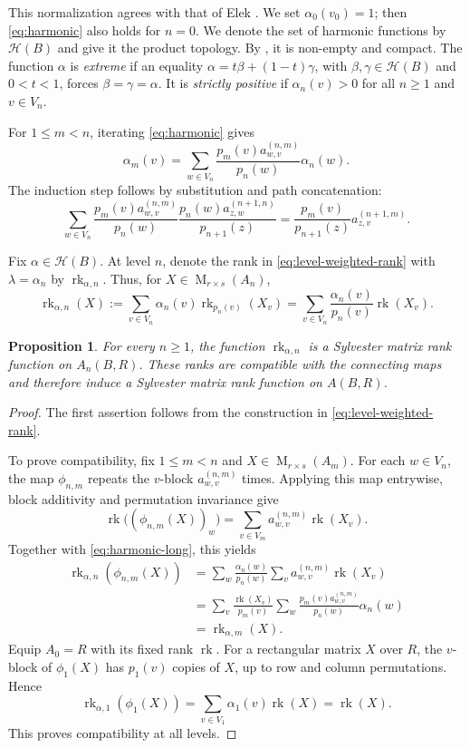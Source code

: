 \documentclass[11pt]{amsart}
\DeclareMathOperator{\rk}{rk}
\DeclareMathOperator{\Mat}{M}
\newtheorem{proposition}[theorem]{Proposition}
\theoremstyle{definition}
\theoremstyle{remark}
\begin{document}
This normalization agrees with that of Elek
\cite[Section~4]{Elek2013}.
We set $\alpha_0(v_0)=1$; then \eqref{eq:harmonic} also holds for $n=0$.
We denote the set of harmonic functions by $\mathcal H(B)$ and give it the
product topology.
By , it is non-empty and compact.
The function $\alpha$ is \emph{extreme} if an equality
$\alpha=t\beta+(1-t)\gamma$, with $\beta,\gamma\in\mathcal H(B)$ and $0<t<1$, forces
$\beta=\gamma=\alpha$.
It is \emph{strictly positive} if $\alpha_n(v)>0$ for all $n\geq1$ and
$v\in V_n$.

For \(1\leq m<n\), iterating \eqref{eq:harmonic} gives
\begin{equation}\label{eq:harmonic-long}
 \alpha_m(v)
 =\sum_{w\in V_n}
 \frac{p_m(v)a_{w,v}^{(n,m)}}{p_n(w)}\alpha_n(w).
\end{equation}
The induction step follows by substitution and path concatenation:
\[
 \sum_{w\in V_n}
 \frac{p_m(v)a_{w,v}^{(n,m)}}{p_n(w)}
 \frac{p_n(w)a_{z,w}^{(n+1,n)}}{p_{n+1}(z)}
 =\frac{p_m(v)}{p_{n+1}(z)}a_{z,v}^{(n+1,m)}.
\]

Fix $\alpha\in\mathcal H(B)$.  At level $n$, denote the rank in
\eqref{eq:level-weighted-rank} with $\lambda=\alpha_n$ by
$\rk_{\alpha,n}$.  Thus, for
$X\in\Mat_{r\times s}(A_n)$,
\begin{equation}\label{eq:weighted-matrix-rank}
 \rk_{\alpha,n}(X)
 :=\sum_{v\in V_n}\alpha_n(v)\rk_{p_n(v)}(X_v)
 =\sum_{v\in V_n}\frac{\alpha_n(v)}{p_n(v)}\rk(X_v).
\end{equation}
\begin{proposition}\label{prop:rank-compatible}
For every $n\geq1$, the function $\rk_{\alpha,n}$ is a Sylvester matrix rank
function on $A_n(B,R)$.  These ranks are compatible with the connecting maps
and therefore induce a Sylvester matrix rank function on $A(B,R)$.
\end{proposition}

\begin{proof}
The first assertion follows from the construction in
\eqref{eq:level-weighted-rank}.

To prove compatibility, fix $1\leq m<n$ and $X\in\Mat_{r\times s}(A_m)$.
For each $w\in V_n$, the map $\phi_{n,m}$ repeats the $v$-block
$a_{w,v}^{(n,m)}$ times.
Applying this map entrywise, block
additivity and permutation invariance give
\[
 \rk\bigl((\phi_{n,m}(X))_w\bigr)
 =\sum_{v\in V_m}a_{w,v}^{(n,m)}\rk(X_v).
\]
Together with \eqref{eq:harmonic-long}, this yields
\begin{align*}
 \rk_{\alpha,n}(\phi_{n,m}(X))
 &=\sum_w\frac{\alpha_n(w)}{p_n(w)}
   \sum_v a_{w,v}^{(n,m)}\rk(X_v)\\
 &=\sum_v\frac{\rk(X_v)}{p_m(v)}
   \sum_w\frac{p_m(v)a_{w,v}^{(n,m)}}{p_n(w)}\alpha_n(w)\\
 &=\rk_{\alpha,m}(X).
\end{align*}
Equip $A_0=R$ with its fixed rank $\rk$.  For a rectangular
matrix $X$ over $R$, the $v$-block of $\phi_1(X)$ has $p_1(v)$ copies
of $X$, up to row and column permutations.  Hence
\[
 \rk_{\alpha,1}(\phi_1(X))
 =\sum_{v\in V_1}\alpha_1(v)\rk(X)=\rk(X).
\]
This proves compatibility at all levels.
\end{proof}
\end{document}
